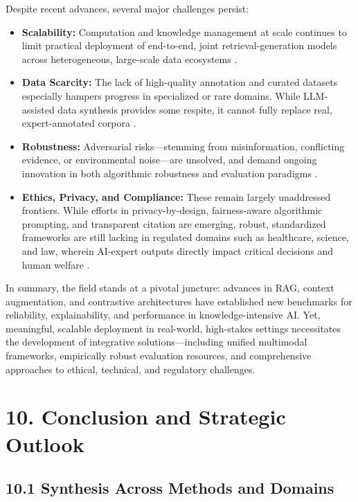 \documentclass[11pt]{article}
\begin{document}
Despite recent advances, several major challenges persist:
\begin{itemize}
    \item \textbf{Scalability:} Computation and knowledge management at scale continues to limit practical deployment of end-to-end, joint retrieval-generation models across heterogeneous, large-scale data ecosystems \cite{ref1,ref4,ref7,ref10,ref21,ref29,ref38,ref46,ref49,ref51,ref52,ref54,ref61,ref62}.
    \item \textbf{Data Scarcity:} The lack of high-quality annotation and curated datasets especially hampers progress in specialized or rare domains. While LLM-assisted data synthesis provides some respite, it cannot fully replace real, expert-annotated corpora \cite{ref8,ref16,ref19,ref22,ref26,ref28,ref31,ref34,ref36}.
    \item \textbf{Robustness:} Adversarial risks—stemming from misinformation, conflicting evidence, or environmental noise—are unsolved, and demand ongoing innovation in both algorithmic robustness and evaluation paradigms \cite{ref2,ref3,ref7,ref37,ref39,ref49,ref51,ref54}.
    \item \textbf{Ethics, Privacy, and Compliance:} These remain largely unaddressed frontiers. While efforts in privacy-by-design, fairness-aware algorithmic prompting, and transparent citation are emerging, robust, standardized frameworks are still lacking in regulated domains such as healthcare, science, and law, wherein AI-expert outputs directly impact critical decisions and human welfare \cite{ref6,ref13,ref23,ref30,ref37,ref45,ref55,ref62,ref63}.
\end{itemize}

In summary, the field stands at a pivotal juncture: advances in RAG, context augmentation, and contrastive architectures have established new benchmarks for reliability, explainability, and performance in knowledge-intensive AI. Yet, meaningful, scalable deployment in real-world, high-stakes settings necessitates the development of integrative solutions—including unified multimodal frameworks, empirically robust evaluation resources, and comprehensive approaches to ethical, technical, and regulatory challenges.

\section{10. Conclusion and Strategic Outlook}

\subsection{10.1 Synthesis Across Methods and Domains}
\end{document}
